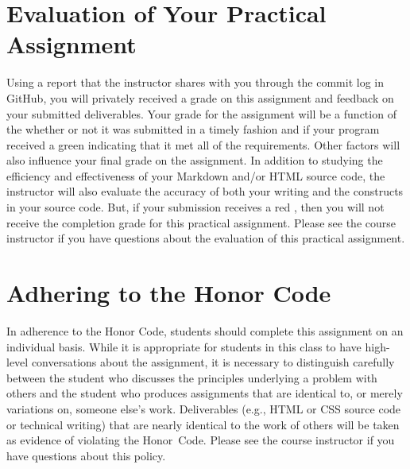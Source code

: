 \documentclass[11pt]{article}
\newcommand{\checkmark}{\ding{51}}
\newcommand{\naughtmark}{\ding{55}}
\begin{document}
\vspace*{-.1in}

\section*{Evaluation of Your Practical Assignment}

Using a report that the instructor shares with you through the commit log in
GitHub, you will privately received a grade on this assignment and feedback on
your submitted deliverables. Your grade for the assignment will be a function of
the whether or not it was submitted in a timely fashion and if your program
received a green \checkmark{} indicating that it met all of the requirements.
Other factors will also influence your final grade on the assignment. In
addition to studying the efficiency and effectiveness of your Markdown and/or
HTML source code, the instructor will also evaluate the accuracy of both your
writing and the constructs in your source code. But, if your submission receives
a red \naughtmark{}, then you will not receive the completion grade for this
practical assignment. Please see the course instructor if you have questions
about the evaluation of this practical assignment.

\section*{Adhering to the Honor Code}

In adherence to the Honor Code, students should complete this assignment on an
individual basis. While it is appropriate for students in this class to have
high-level conversations about the assignment, it is necessary to distinguish
carefully between the student who discusses the principles underlying a problem
with others and the student who produces assignments that are identical to, or
merely variations on, someone else's work. Deliverables (e.g., HTML or CSS
source code or technical writing) that are nearly identical to the work of
others will be taken as evidence of violating the \mbox{Honor Code}. Please see
the course instructor if you have questions about this policy.
\end{document}
